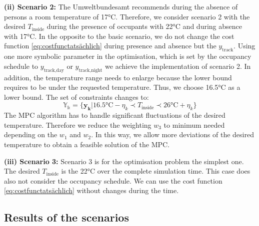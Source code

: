 \textbf{(ii) Scenario 2:}\newline
The Umweltbundesamt \cite{Umweltbundesamt.7.10.2021} recommends during the absence of persons a room temperature of 17°C. Therefore, we consider scenario 2 with the desired $T_\text{inside}$ during the presence of occupants with 22°C and during absence with 17°C. In the opposite to the basic scenario, we do not change the cost function \ref{eq:costfunctatsächlich} during presence and absence but the $y_\text{track}$. Using one more symbolic parameter in the optimisation, which is set by the occupancy schedule to $y_\text{track,day}$ or $y_\text{track,night}$ we achieve the implementation of scenario 2. In addition, the temperature range needs to enlarge because the lower bound requires to be under the requested temperature. Thus, we choose 16.5°C as a lower bound. The set of constraints changes to:
\begin{equation}
    \label{ConstraintYScenario2}
    \mathbb{Y_k} = \{\mathbf{y_k}| 16.5 \text{°C} - \eta_k \prec T_\text{inside} \prec 26 \text{°C}+ \eta_k\} 
\end{equation}
The MPC algorithm has to handle significant fluctuations of the desired temperature. Therefore we reduce the weighting $w_\text{3}$ to minimum needed depending on the $w_\text{1}$ and $w_\text{2}$. In this way, we allow more deviations of the desired temperature to obtain a feasible solution of the MPC. \newline 

\textbf{(iii) Scenario 3:}\newline
Scenario 3 is for the optimisation problem the simplest one. The desired $T_\text{inside}$ is the 22°C over the complete simulation time. This case does also not consider the occupancy schedule. We can use the cost function \ref{eq:costfunctatsächlich} without changes during the time.

\subsection{Results of the scenarios}
\label{subsec:Results of the scenarios}
    \begin{figure}[h]
           \centering
        \def\svgwidth{0.85\textwidth}
        
        \caption{}
         \label{fig:HP_grid}
    \end{figure}
    
    \begin{figure}[h]
           \centering
        \def\svgwidth{1\textwidth}
        
        \caption{}
         \label{fig:HeizverlaufGewichte}
    \end{figure}
